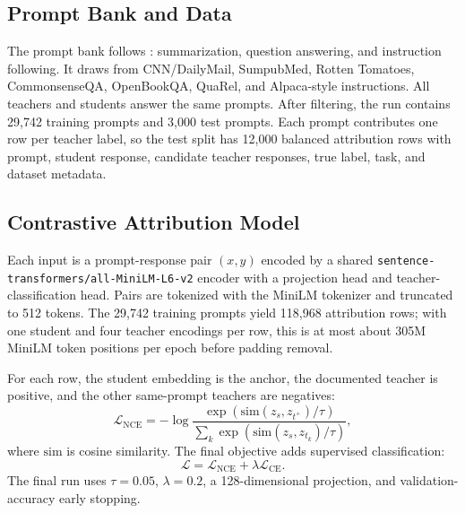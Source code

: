 \documentclass[11pt]{article}
\begin{document}
\begin{table}[t]
\centering
\small
{}
\caption{Public teacher-student pairs used for attribution.}
\label{tab:pairs}
\end{table}

\subsection{Prompt Bank and Data}

The prompt bank follows \citet{wadhwa-etal-2025-taught}: summarization, question answering, and instruction following.
It draws from CNN/DailyMail, SumpubMed, Rotten Tomatoes, CommonsenseQA, OpenBookQA, QuaRel, and Alpaca-style instructions.
All teachers and students answer the same prompts.
After filtering, the run contains 29,742 training prompts and 3,000 test prompts.
Each prompt contributes one row per teacher label, so the test split has 12,000 balanced attribution rows with prompt, student response, candidate teacher responses, true label, task, and dataset metadata.

\subsection{Contrastive Attribution Model}

Each input is a prompt-response pair $(x,y)$ encoded by a shared \texttt{sentence-transformers/all-MiniLM-L6-v2} encoder with a projection head and teacher-classification head.
Pairs are tokenized with the MiniLM tokenizer and truncated to 512 tokens.
The 29,742 training prompts yield 118,968 attribution rows; with one student and four teacher encodings per row, this is at most about 305M MiniLM token positions per epoch before padding removal.

For each row, the student embedding is the anchor, the documented teacher is positive, and the other same-prompt teachers are negatives:
\begin{equation}
\mathcal{L}_{\mathrm{NCE}} =
-\log \frac{\exp(\mathrm{sim}(z_s,z_{t^+})/\tau)}
{\sum_{k}\exp(\mathrm{sim}(z_s,z_{t_k})/\tau)} ,
\end{equation}
where $\mathrm{sim}$ is cosine similarity. The final objective adds supervised classification:
\begin{equation}
\mathcal{L} = \mathcal{L}_{\mathrm{NCE}} + \lambda \mathcal{L}_{\mathrm{CE}} .
\end{equation}
The final run uses $\tau=0.05$, $\lambda=0.2$, a 128-dimensional projection, and validation-accuracy early stopping.
\end{document}
